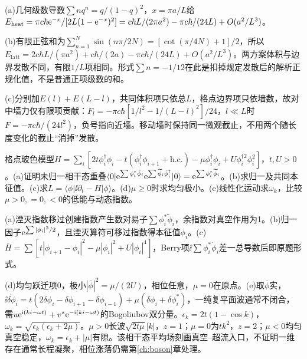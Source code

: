 \begin{solution}
(a)几何级数导数$\sum n q^n=q/(1-q)^2$，$x=\pi a/L$给$E_{\mathrm{heat}}=\pi c\hbar\mathrm e^{-x}/[2L(1-\mathrm e^{-x})^2]=c\hbar L/(2\pi a^2)-\pi c\hbar/(24L)+O(a^2/L^3)$。

(b)有限正弦和为$\sum_{n=1}^N\sin(n\pi/2N)=[\cot(\pi/4N)+1]/2$，所以$E_{\mathrm{latt}}=2c\hbar L/(\pi a^2)+c\hbar/(2a)-\pi c\hbar/(24L)+O(a^2/L^3)$。两方案体积与边界发散不同，有限$1/L$项相同。形式$\sum n=-1/12$在此是扣掉规定发散后的解析正规化值，不是普通正项级数的和。

(c)分别加$E(l)+E(L-l)$，共同体积项只依总$L$，格点边界项只依墙数，故对中墙力仅有限项贡献：$F_l=-\pi c\hbar[1/l^2-1/(L-l)^2]/24$，$l\ll L$时$F=-\pi c\hbar/(24l^2)$，负号指向近墙。移动墙时保持同一微观截止，不用两个随长度变化的截止“消掉”发散。
\end{solution}
\begin{exercise}[原题2(a)--(e)]
格点玻色模型$H=\sum_i[2t\phi_i^\dagger\phi_i-t(\phi_i^\dagger\phi_{i+1}+\mathrm{h.c.})-\mu\phi_i^\dagger\phi_i+U\phi_i^{\dagger2}\phi_i^2]$，$t,U>0$。(a)证明未归一相干态重叠$\langle0|\mathrm e^{\sum\phi_i^*\hat\phi_i}\mathrm e^{\sum\widetilde\phi_i\hat\phi_i^\dagger}|0\rangle=\mathrm e^{\sum\phi_i^*\widetilde\phi_i}$。(b)求归一及共同本征值。(c)求$L=\langle\phi|\ii\partial_t-H|\phi\rangle$。(d)$\mu\ge0$时求均匀极小。(e)线性化运动求$\omega_k$，比较$\mu>0,=0,<0$的低能与动态指数。
\end{exercise}
\begin{solution}
(a)湮灭指数移过创建指数产生数对易子$\sum\phi_i^*\widetilde\phi_i$，余指数对真空作用为1。(b)归一因子$\mathrm e^{\sum|\phi_i|^2/2}$，且湮灭算符可移过指数得本征值$\phi_i$。(c)$\bar H=\sum[t|\phi_{i+1}-\phi_i|^2-\mu|\phi_i|^2+U|\phi_i|^4]$，Berry项$\ii\sum\phi_i^*\dot\phi_i$差一总导数后即原题形式。

(d)均匀跃迁项0，极小$|\bar\phi|^2=\mu/(2U)$，相位任意，$\mu=0$在原点。(e)取$\bar\phi$实，$\ii\dot{\delta\phi_i}=t(2\delta\phi_i-\delta\phi_{i+1}-\delta\phi_{i-1})+\mu(\delta\phi_i+\delta\phi_i^*)$，一纯复平面波通常不闭合，需$u\mathrm e^{\mathrm i(ki-\omega t)}+v^*\mathrm e^{-\mathrm i(ki-\omega t)}$的Bogoliubov双分量。$\epsilon_k=2t(1-\cos k)$，$\omega_k=\sqrt{\epsilon_k(\epsilon_k+2\mu)}$。$\mu>0$长波$\sqrt{2t\mu}|k|$，$z=1$；$\mu=0$为$tk^2$，$z=2$；$\mu<0$均匀真空稳定，$\omega_k=\epsilon_k+|\mu|$有隙。该相干态平均场刻画真空--超流入口，不证明一维存在通常长程凝聚，相位涨落仍需第\ref{ch:boson}章处理。
\end{solution}
